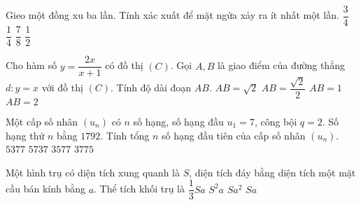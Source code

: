 \begin{ex}%
		Gieo một đồng xu ba lần. Tính xác xuất để mặt ngửa xảy ra ít nhất một lần.
	\choice
		{$\dfrac{3}{4}$}
		{$\dfrac{1}{4}$}
		{\True $\dfrac{7}{8}$}
		{$\dfrac{1}{2}$}
\end{ex}
\begin{ex}%
		Cho hàm số $y=\dfrac{2x}{x+1}$ có đồ thị $(C)$. Gọi $A,B$ là giao điểm của đường thẳng $d:y=x$ với đồ thị $(C)$. Tính độ dài đoạn $AB$.
	\choice
		{\True $AB=\sqrt{2}$}
		{ $AB=\dfrac{\sqrt{2}}{2}$}
		{$AB=1$}
		{ $AB=2$}
	\loigiai{
		Phương trình hoành độ giao điểm\\
		 $\dfrac{2x}{x+1}=x,\left({x\ne -1}\right)$$\Rightarrow x^2-x=0\Rightarrow \left[{\begin{aligned}&{x=0\Rightarrow y=0\Rightarrow A\left({0;0}\right)} \\ &{x=1\Rightarrow y=1\Rightarrow B\left({1;1}\right)} \\ \end{aligned}}\right.$\\
		Vậy $AB=\sqrt{2}$.
	}
\end{ex}
\begin{ex}%
		Một cấp số nhân $\left(u_n\right)$ có $n$ số hạng, số hạng đầu $u_1=7$, công bội $q=2$. Số hạng thứ $n$ bằng $1792$. Tính tổng $n$ số hạng đầu tiên của cấp số nhân $\left(u_n\right)$.
	\choice
		{$5377$}
		{$5737$}
		{\True $3577$}
		{$3775$}
\end{ex}
\begin{ex}%
		Một hình trụ có diện tích xung quanh là $S$, diện tích đáy bằng diện tích một mặt cầu bán kính bằng $a$. Thể tích khối trụ là
	\choice
		{$\dfrac{1}{3}Sa$}
		{$S^2a$}
		{$Sa^2$}
		{\True $Sa$}
\end{ex}

